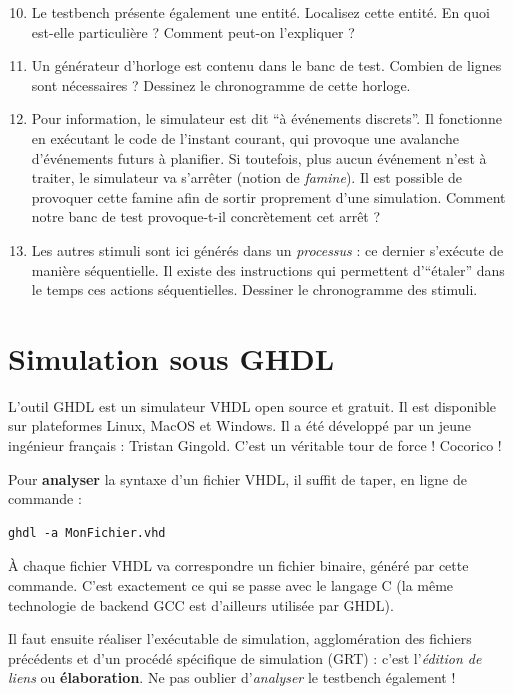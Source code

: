 \documentclass[a4paper,11pt]{article}
\begin{document}
\begin{questionbox}
\begin{enumerate}
    \setcounter{enumi}{9}
    \item Le testbench présente également une entité. Localisez cette entité. En quoi est-elle particulière ? Comment peut-on l'expliquer ?
    \item Un générateur d'horloge est contenu dans le banc de test. Combien de lignes sont nécessaires ? Dessinez le chronogramme de cette horloge.
    \item Pour information, le simulateur est dit ``à événements discrets''. Il fonctionne en exécutant le code de l'instant courant, qui provoque une avalanche d'événements futurs à planifier. Si toutefois, plus aucun événement n'est à traiter, le simulateur va s'arrêter (notion de \textit{famine}). Il est possible de provoquer cette famine afin de sortir proprement d'une simulation. Comment notre banc de test provoque-t-il concrètement cet arrêt ?
    \item Les autres stimuli sont ici générés dans un \textit{processus} : ce dernier s'exécute de manière séquentielle. Il existe des instructions qui permettent d'``étaler'' dans le temps ces actions séquentielles. Dessiner le chronogramme des stimuli.
\end{enumerate}
\end{questionbox}

\section{Simulation sous GHDL}

L'outil GHDL est un simulateur VHDL open source et gratuit. Il est disponible sur plateformes Linux, MacOS et Windows. Il a été développé par un jeune ingénieur français : Tristan Gingold. C'est un véritable tour de force ! Cocorico !

Pour \textbf{analyser} la syntaxe d'un fichier VHDL, il suffit de taper, en ligne de commande :

\begin{lstlisting}[style=bashstyle]
ghdl -a MonFichier.vhd
\end{lstlisting}

À chaque fichier VHDL va correspondre un fichier binaire, généré par cette commande. C'est exactement ce qui se passe avec le langage C (la même technologie de backend GCC est d'ailleurs utilisée par GHDL).

Il faut ensuite réaliser l'exécutable de simulation, agglomération des fichiers précédents et d'un procédé spécifique de simulation (GRT) : c'est l'\textit{édition de liens} ou \textbf{élaboration}. Ne pas oublier d'\textit{analyser} le testbench également !
\end{document}
